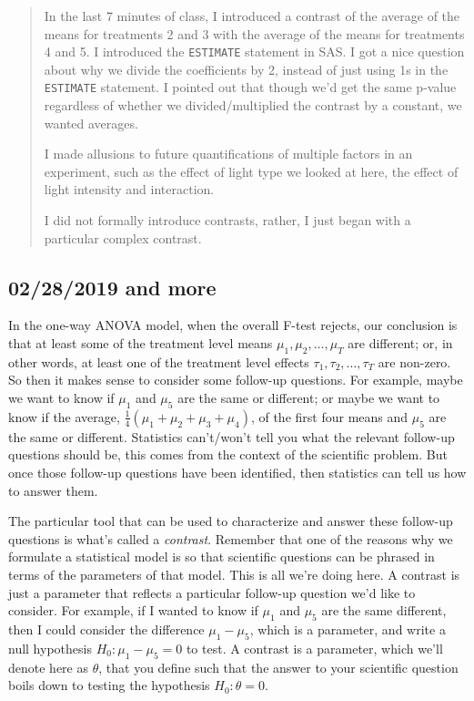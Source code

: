 \documentclass[a4paper, 12pt]{article}
\theoremstyle{plain}
\theoremstyle{definition}
\theoremstyle{remark}
\begin{document}
{\begin{quote}
In the last 7 minutes of class, I introduced a contrast of the average of the means for treatments 2 and 3 with the average 
of the means for treatments 4 and 5.  I introduced the {\tt ESTIMATE} statement in SAS.  I got a nice question about why we divide 
the coefficients by 2, instead of just using 1s in the {\tt ESTIMATE} statement.  I pointed out that though we'd get the same p-value 
regardless of whether we divided/multiplied the contrast by a constant, we wanted averages.

I made allusions to future quantifications of multiple factors in an experiment, such as the effect of light type we looked at
here, the effect of light intensity and interaction.

I did not formally introduce contrasts, rather, I just began with a particular complex contrast.
\end{quote}
}


\subsection*{02/28/2019 and more}

In the one-way ANOVA model, when the overall F-test rejects, our conclusion is that at least some of the treatment level means $\mu_1, \mu_2, \ldots, \mu_T$ are different; or, in other words, at least one of the treatment level effects $\tau_1, \tau_2, \ldots, \tau_T$ are non-zero.  So then it makes sense to consider some follow-up questions.  For example, maybe we want to know if $\mu_1$ and $\mu_5$ are the same or different; or maybe we want to know if the average, $\frac14(\mu_1 + \mu_2 + \mu_3 + \mu_4)$, of the first four means and $\mu_5$ are the same or different.  Statistics can't/won't tell you what the relevant follow-up questions should be, this comes from the context of the scientific problem.  But once those follow-up questions have been identified, then statistics can tell us how to answer them.  

The particular tool that can be used to characterize and answer these follow-up questions is what's called a {\em contrast}.  Remember that one of the reasons why we formulate a statistical model is so that scientific questions can be phrased in terms of the parameters of that model.  This is all we're doing here.  A contrast is just a parameter that reflects a particular follow-up question we'd like to consider.  For example, if I wanted to know if $\mu_1$ and $\mu_5$ are the same different, then I could consider the difference $\mu_1 - \mu_5$, which is a parameter, and write a null hypothesis $H_0: \mu_1 - \mu_5 = 0$ to test.  A contrast is a parameter, which we'll denote here as $\theta$, that you define such that the answer to your scientific question boils down to testing the hypothesis $H_0: \theta = 0$.  
\end{document}
